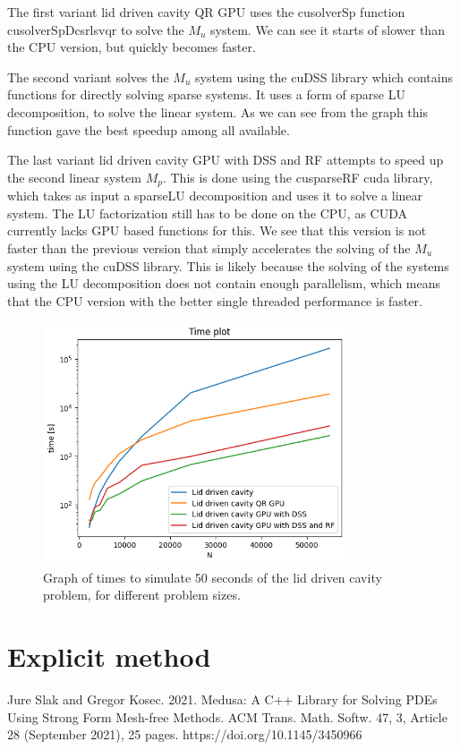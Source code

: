 \documentclass[12pt]{article}
\begin{document}
The first variant lid driven cavity QR GPU uses the cusolverSp function cusolverSpDcsrlsvqr to 
solve the \(M_u\) system. We can see it starts of slower than the CPU version, but quickly becomes
faster.

The second variant solves the \(M_u\) system using the cuDSS library which contains 
functions for directly solving sparse systems. It uses a form of sparse LU decomposition, to solve
the linear system. As we can see from the graph this function gave the best speedup among all available.

The last variant lid driven cavity GPU with DSS and RF attempts to speed up the second linear system 
\(M_p\). This is done using the cusparseRF cuda library, which takes as input a sparseLU decomposition 
and uses it to solve a linear system. The LU factorization still has to be done on the CPU, 
as CUDA currently lacks GPU based functions for this. We see that this version is not faster than 
the previous version that simply accelerates the solving of the \(M_u\) system using the cuDSS library.
This is likely because the solving of the systems using the LU decomposition does not contain enough
parallelism, which means that the CPU version with the better single threaded performance is faster.
\begin{figure}[h!] 
    \centering 
    \includegraphics[width=0.8\textwidth]{lidDriven_time.png} 
    \caption{Graph of times to simulate 50 seconds of the lid driven cavity problem, 
    for different problem sizes.} 
    \label{fig:lidDriven_time} 
\end{figure}
\section{Explicit method}
\begin{thebibliography}{99}
     Jure Slak and Gregor Kosec. 2021. Medusa: A C++ Library
    for Solving PDEs Using Strong Form Mesh-free Methods. ACM Trans. Math. Softw. 47,
    3, Article 28 (September 2021), 25 pages. https://doi.org/10.1145/3450966
\end{thebibliography}
\end{document}
